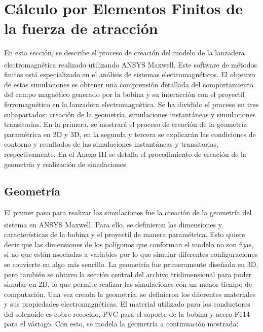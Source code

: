 \section{Cálculo por Elementos Finitos de la fuerza de atracción}
\label{sec:simulaciones}

En esta sección, se describe el proceso de creación del modelo de la lanzadera electromagnética realizado utilizando ANSYS Maxwell\textsuperscript{\textregistered}. Este software de métodos finitos está especializado en el análisis de sistemas electromagnéticos. El objetivo de estas simulaciones es obtener una comprensión detallada del comportamiento del campo magnético generado por la bobina y su interacción con el proyectil ferromagnético en la lanzadera electromagnética. Se ha dividido el proceso en tres subapartados: creación de la geometría, simulaciones instantáneas y simulaciones transitorias. En la primera, se mostrará el proceso de creación de la geometría paramétrica en 2D y 3D, en la segunda y tercera se explicarán las condiciones de contorno y resultados de las simulaciones instantáneas y transitorias, respectivamente. En el Anexo III se detalla el procedimiento de creación de la geometría y realización de simulaciones.

\subsection{Geometría}
El primer paso para realizar las simulaciones fue la creación de la geometría del sistema en ANSYS Maxwell\textsuperscript{\textregistered}. Para ello, se definieron las dimensiones y características de la bobina y el proyectil de manera paramétrica. Esto quiere decir que las dimensiones de los polígonos que conforman el modelo no son fijas, si no que están asociadas a variables por lo que simular diferentes configuraciones se convierte en algo más sencillo. La geometría fue primeramente diseñada en 3D, pero también se obtuvo la sección central del archivo tridimensional para poder simular en 2D, lo que permite realizar las simulaciones con un menor tiempo de computación. Una vez creada la geometría, se definieron los diferentes materiales y sus propiedades electromagnéticas. El material utilizado para los conductores del solenoide es cobre recocido, PVC para el soporte de la bobina y acero F114 para el vástago. Con esto, se modela la geometría a continuación mostrada:

